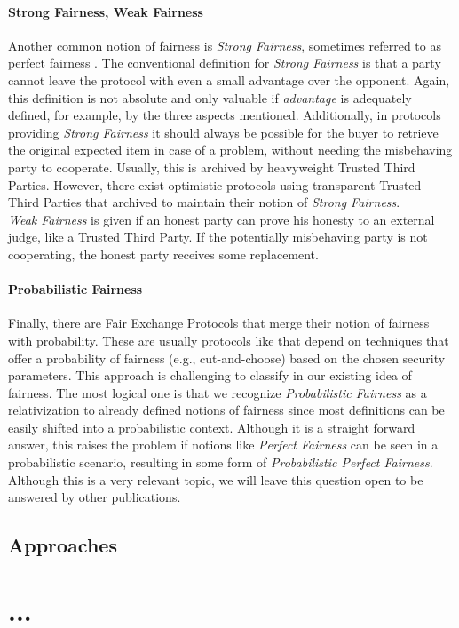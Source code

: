 \documentclass{cacthesis}
\begin{document}
        \subsubsection{Strong Fairness, Weak Fairness}
        Another common notion of fairness is \textit{Strong Fairness}, sometimes referred to as perfect fairness \cite{DELGADOSEGURA2020832}. The conventional definition for \textit{Strong Fairness} is that a party cannot leave the protocol with even a small advantage over the opponent. Again, this definition is not absolute and only valuable if \textit{advantage} is adequately defined, for example, by the three aspects mentioned. Additionally, in protocols providing \textit{Strong Fairness} it should always be possible for the buyer to retrieve the original expected item in case of a problem, without needing the misbehaving party to cooperate. Usually, this is archived by heavyweight Trusted Third Parties. However, there exist optimistic protocols using transparent Trusted Third Parties \cite{10.1145/3243734.3243857} \cite{6982058} that archived to maintain their notion of \textit{Strong Fairness}. \\
        \textit{Weak Fairness} is given if an honest party can prove his honesty to an external judge, like a Trusted Third Party. If the potentially misbehaving party is not cooperating, the honest party receives some replacement. 
        \subsubsection{Probabilistic Fairness}
        Finally, there are Fair Exchange Protocols that merge their notion of fairness with probability. These are usually protocols like \cite{DELGADOSEGURA2020832} that depend on techniques that offer a probability of fairness (e.g., cut-and-choose) based on the chosen security parameters. This approach is challenging to classify in our existing idea of fairness. The most logical one is that we recognize \textit{Probabilistic Fairness} as a relativization to already defined notions of fairness since most definitions can be easily shifted into a probabilistic context. Although it is a straight forward answer, this raises the problem if notions like \textit{Perfect Fairness} can be seen in a probabilistic scenario, resulting in some form of \textit{Probabilistic Perfect Fairness}. Although this is a very relevant topic, we will leave this question open to be answered by other publications.
        
        \section{Approaches}

		
	\chapter{...}
	
	\newpage
    
    
	
	\appendix
\end{document}
